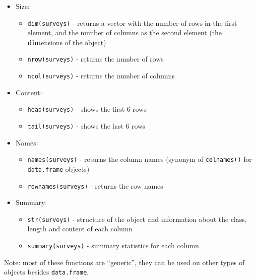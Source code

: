\documentclass[]{book}
\providecommand{\tightlist}{%
  \setlength{\itemsep}{0pt}\setlength{\parskip}{0pt}}
\begin{document}
\begin{itemize}
\tightlist
\item
  Size:

  \begin{itemize}
  \tightlist
  \item
    \texttt{dim(surveys)} - returns a vector with the number of rows in
    the first element, and the number of columns as the second element
    (the \textbf{dim}ensions of the object)
  \item
    \texttt{nrow(surveys)} - returns the number of rows
  \item
    \texttt{ncol(surveys)} - returns the number of columns
  \end{itemize}
\item
  Content:

  \begin{itemize}
  \tightlist
  \item
    \texttt{head(surveys)} - shows the first 6 rows
  \item
    \texttt{tail(surveys)} - shows the last 6 rows
  \end{itemize}
\item
  Names:

  \begin{itemize}
  \tightlist
  \item
    \texttt{names(surveys)} - returns the column names (synonym of
    \texttt{colnames()} for \texttt{data.frame} objects)
  \item
    \texttt{rownames(surveys)} - returns the row names
  \end{itemize}
\item
  Summary:

  \begin{itemize}
  \tightlist
  \item
    \texttt{str(surveys)} - structure of the object and information
    about the class, length and content of each column
  \item
    \texttt{summary(surveys)} - summary statistics for each column
  \end{itemize}
\end{itemize}

Note: most of these functions are ``generic'', they can be used on other
types of objects besides \texttt{data.frame}.
\end{document}
